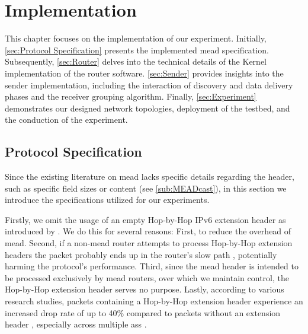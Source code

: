\chapter{Implementation} %
\label{chap:Implementation}
This chapter focuses on the implementation of our experiment.
Initially, \autoref{sec:Protocol Specification} presents the implemented
    \gls{mead} specification.
Subsequently, \autoref{sec:Router} delves into the technical details of the
    Kernel implementation of the router software.
\autoref{sec:Sender} provides insights into the sender implementation, including
    the interaction of discovery and data delivery phases and the receiver
    grouping algorithm.
Finally, \autoref{sec:Experiment} demonstrates our designed network topologies,
    deployment of the testbed, and the conduction of the experiment.

\section{Protocol Specification} %
\label{sec:Protocol Specification}
Since the existing literature on \gls{mead} \cite{meadcast1,meadcast2} lacks
    specific details regarding the header, such as specific field sizes or
    content (see \autoref{sub:MEADcast}), in this section we introduce the
    specifications utilized for our experiments.

Firstly, we omit the usage of an empty Hop-by-Hop IPv6 extension header as
    introduced by \citeauthor{meadcast1} \cite{meadcast1, meadcast2}.
We do this for several reasons:
First, to reduce the overhead of \gls{mead}.
Second, if a non-\gls{mead} router attempts to process Hop-by-Hop extension
    headers the packet probably ends up in the router's slow path
    \cite{rfc7045}, potentially harming the protocol's performance.
Third, since the \gls{mead} header is intended to be processed exclusively by
    \gls{mead} routers, over which we maintain control, the Hop-by-Hop
    extension header serves no purpose.
Lastly, according to various research studies, packets containing a Hop-by-Hop
    extension header experience an increased drop rate of up to 40\% compared
    to packets without an extension header \cite{rfc7872_ext_hdrs_drop_rate},
    especially across multiple \glspl{as}
    \cite{rfc9098_ext_hdrs_op_impl, rfc9288}.

